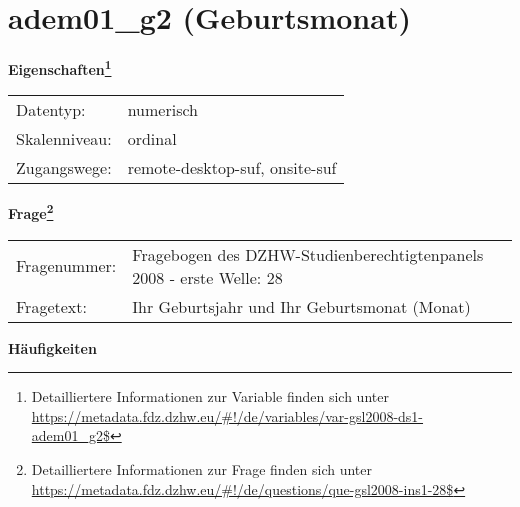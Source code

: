 
    \setcounter{footnote}{0}

    \vspace*{-1.8cm}
	\section{adem01\_g2 (Geburtsmonat)}
	\label{section:adem01_g2}



    \vspace*{0.5cm}
    \noindent\textbf{Eigenschaften\footnote{Detailliertere Informationen zur Variable finden sich unter
		\url{https://metadata.fdz.dzhw.eu/\#!/de/variables/var-gsl2008-ds1-adem01_g2$}}}\\
	\begin{tabularx}{\hsize}{@{}lX}
	Datentyp: & numerisch \\
	Skalenniveau: & ordinal \\
	Zugangswege: &
	  remote-desktop-suf, 
	  onsite-suf
 \\
    \end{tabularx}



				\vspace*{0.5cm}
                \noindent\textbf{Frage\footnote{Detailliertere Informationen zur Frage finden sich unter
		              \url{https://metadata.fdz.dzhw.eu/\#!/de/questions/que-gsl2008-ins1-28$}}}\\
				\begin{tabularx}{\hsize}{@{}lX}
					Fragenummer: &
					  Fragebogen des DZHW-Studienberechtigtenpanels 2008 - erste Welle:
					  28
 \\
					Fragetext: & Ihr Geburtsjahr und Ihr Geburtsmonat (Monat) \\
				\end{tabularx}





        		\vspace*{0.5cm}
                \noindent\textbf{Häufigkeiten}


